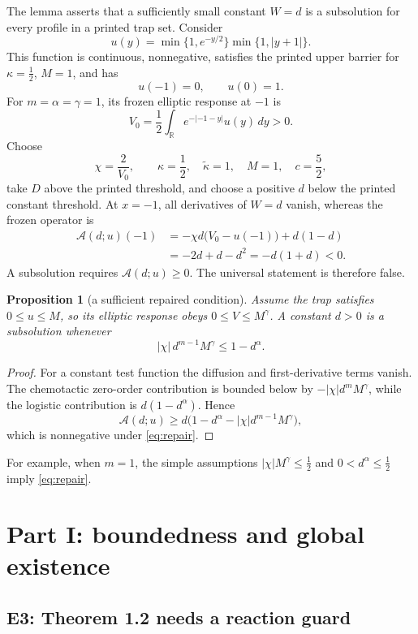 \documentclass[11pt]{article}
\newcommand{\R}{\mathbb{R}}
\newcommand{\abs}[1]{\left\lvert #1\right\rvert}
\newtheorem{proposition}{Proposition}
\begin{document}
The lemma asserts that a sufficiently small constant \(W=d\) is a
subsolution for every profile in a printed trap set.  Consider
\[
 u(y)=\min\{1,e^{-y/2}\}\min\{1,\abs{y+1}\}.
\]
This function is continuous, nonnegative, satisfies the printed upper
barrier for \(\kappa=\tfrac12\), \(M=1\), and has
\[
 u(-1)=0,\qquad u(0)=1.
\]
For \(m=\alpha=\gamma=1\), its frozen elliptic response at \(-1\) is
\[
 V_0=\frac12\int_\R e^{-\abs{-1-y}}u(y)\,dy>0.
\]
Choose
\[
 \chi=\frac2{V_0},\qquad
 \kappa=\frac12,\quad \widetilde\kappa=1,\quad M=1,\quad c=\frac52,
\]
take \(D\) above the printed threshold, and choose a positive \(d\) below
the printed constant threshold.  At \(x=-1\), all derivatives of \(W=d\)
vanish, whereas the frozen operator is
\[
\begin{aligned}
 \mathcal A(d;u)(-1)
 &= -\chi d\bigl(V_0-u(-1)\bigr)+d(1-d)\\
 &= -2d+d-d^2=-d(1+d)<0.
\end{aligned}
\]
A subsolution requires \(\mathcal A(d;u)\ge0\).  The universal statement is
therefore false.

\begin{proposition}[a sufficient repaired condition]
Assume the trap satisfies \(0\le u\le M\), so its elliptic response obeys
\(0\le V\le M^\gamma\).  A constant \(d>0\) is a subsolution whenever
\begin{equation}
  \abs{\chi}\,d^{m-1}M^\gamma\le 1-d^\alpha.             \label{eq:repair}
\end{equation}
\end{proposition}

\begin{proof}
For a constant test function the diffusion and first-derivative terms
vanish.  The chemotactic zero-order contribution is bounded below by
\(-\abs{\chi}d^mM^\gamma\), while the logistic contribution is
\(d(1-d^\alpha)\).  Hence
\[
 \mathcal A(d;u)\ge
 d\bigl(1-d^\alpha-\abs{\chi}d^{m-1}M^\gamma\bigr),
\]
which is nonnegative under \eqref{eq:repair}.
\end{proof}

For example, when \(m=1\), the simple assumptions
\(\abs{\chi}M^\gamma\le\tfrac12\) and \(0<d^\alpha\le\tfrac12\)
imply \eqref{eq:repair}.

\section{Part I: boundedness and global existence}

\subsection{E3: Theorem 1.2 needs a reaction guard}
\end{document}
